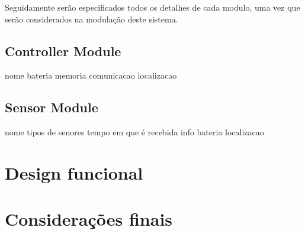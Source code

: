 Seguidamente serão especificados todos os detalhes de cada modulo, uma vez que serão considerados na modulação deste sistema. 

\subsection{Controller Module}

nome
bateria
memoria
comunicacao
localizacao


\subsection{Sensor Module}


nome
tipos de senores 
tempo em que é recebida info 
bateria
localizacao



\newpage

\section{Design funcional}













\section{Considerações finais}